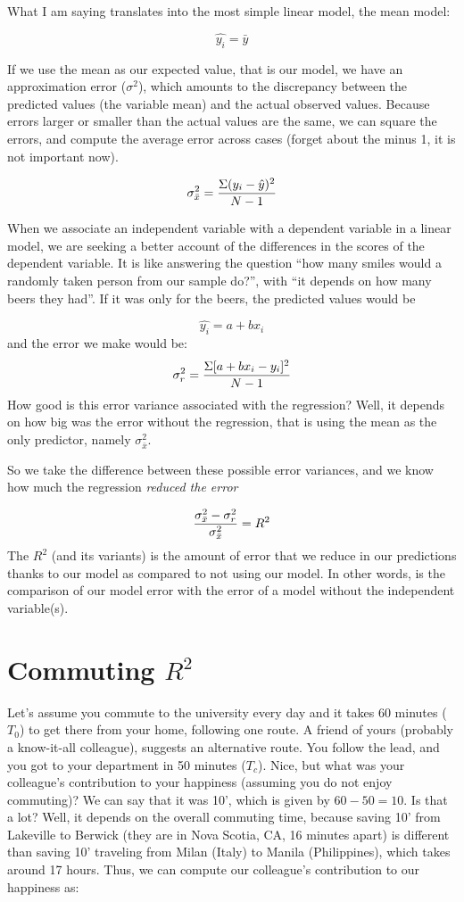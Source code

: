 \documentclass[
]{book}
\begin{document}
What I am saying translates into the most simple linear model, the mean model:

\[ \hat{y_i}=\bar{y}\]

If we use the mean as our expected value, that is our model, we have an approximation error (\(\sigma^2\)), which amounts to the discrepancy between the predicted values (the variable mean) and the actual observed values. Because errors larger or smaller than the actual values are the same, we can square the errors, and compute the average error across cases (forget about the minus 1, it is not important now).

\[ \sigma^2_{\bar{x}}={\Sigma{(y_i-\hat{y})^2} \over {N-1}}\]

When we associate an independent variable with a dependent variable in a linear model, we are seeking a better account of the differences in the scores of the dependent variable. It is like answering the question ``how many smiles would a randomly taken person from our sample do?'', with ``it depends on how many beers they had''. If it was only for the beers, the predicted values would be

\[ \hat{y_i}=a+bx_i\]
and the error we make would be:
\[ \sigma^2_r={\Sigma{[a+bx_i-y_i]^2} \over {N-1}}\]
How good is this error variance associated with the regression? Well, it depends on how big was the error without the regression, that is using the mean as the only predictor, namely \(\sigma^2_{\bar{x}}\).

So we take the difference between these possible error variances, and we know how much the regression \emph{reduced the error}

\[ {\sigma^2_{\bar{x}}-\sigma^2_r \over \sigma^2_{\bar{x}}}=R^2\]
The \(R^2\) (and its variants) is the amount of error that we reduce in our predictions thanks to our model as compared to not using our model. In other words, is the comparison of our model error with the error of a model without the independent variable(s).

\hypertarget{commuting-r2}{%
\section{\texorpdfstring{Commuting \(R^2\)}{Commuting R\^{}2}}\label{commuting-r2}}

Let's assume you commute to the university every day and it takes 60 minutes (\(T_0\)) to get there from your home, following one route. A friend of yours (probably a know-it-all colleague), suggests an alternative route. You follow the lead, and you got to your department in 50 minutes (\(T_c\)). Nice, but what was your colleague's contribution to your happiness (assuming you do not enjoy commuting)? We can say that it was 10', which is given by \(60-50=10\). Is that a lot? Well, it depends on the overall commuting time, because saving 10' from Lakeville to Berwick (they are in Nova Scotia, CA, 16 minutes apart) is different than saving 10' traveling from Milan (Italy) to Manila (Philippines), which takes around 17 hours. Thus, we can compute our colleague's contribution to our happiness as:
\end{document}
